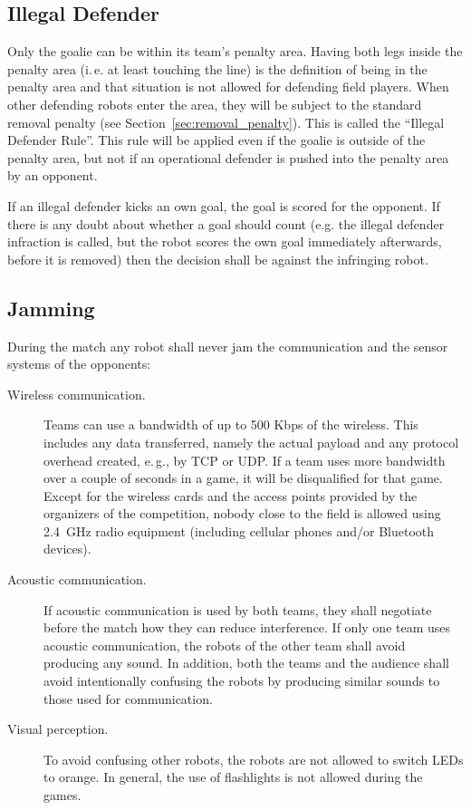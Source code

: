 \documentclass[12pt]{article}
\newcommand{\ie}{\mbox{i.\,e.}\xspace}
\newcommand{\eg}{\mbox{e.\,g.}\xspace}
\begin{document}
\subsection{Illegal Defender}

Only the goalie can be within its team's penalty area. Having both legs inside the penalty area (\ie at least touching the line) is the definition of being in the penalty area and that situation is not allowed for defending field players. When other defending robots enter the area, they will be subject to the standard removal penalty (see Section~\ref{sec:removal_penalty}). This is called the ``Illegal Defender Rule''. This rule will be applied even if the goalie is outside of the penalty area, but not if an operational defender is pushed into the penalty area by an opponent.

If an illegal defender kicks an own goal, the goal is scored for the opponent. If there is any doubt about whether a goal should count (e.g. the illegal defender infraction is called, but the robot scores the own goal immediately afterwards, before it is removed) then the decision shall be against the infringing robot.

\subsection{Jamming}

During the match any robot shall never jam the communication and the sensor systems of the opponents:

\begin{description}

\item[Wireless communication.] Teams can use a bandwidth of up to 500 Kbps of the wireless. This includes any data transferred, namely the actual payload and any protocol overhead created, \eg, by TCP or UDP. If a team uses more bandwidth over a couple of seconds in a game, it will be disqualified for that game. Except for the wireless cards and the access points provided by the organizers of the competition, nobody close to the field is allowed using 2.4~GHz radio equipment (including cellular phones and/or Bluetooth devices).

\item[Acoustic communication.] If acoustic communication is used by both teams, they shall negotiate before the match how they can reduce interference. If only one team uses acoustic communication, the robots of the other team shall avoid producing any sound. In addition, both the teams and the audience shall avoid intentionally confusing the robots by producing similar sounds to those used for communication.

\item[Visual perception.] To avoid confusing other robots, the robots are not allowed to switch LEDs to orange. In general, the use of flashlights is not allowed during the games.

\end{description}
\end{document}
